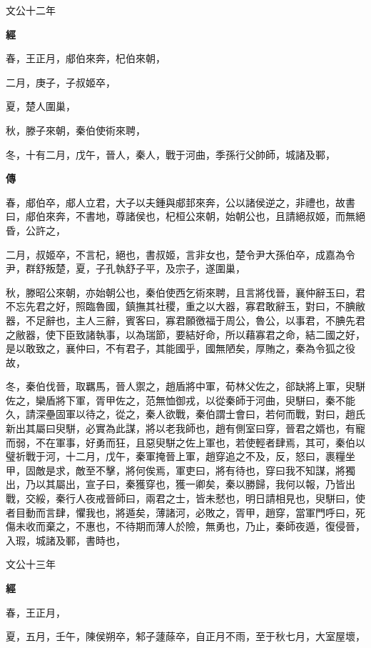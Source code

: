 \documentclass{ctexart}
\begin{document}
文公十二年


\textbf{經}



春，王正月，郕伯來奔，杞伯來朝，

二月，庚子，子叔姬卒，

夏，楚人圍巢，

秋，滕子來朝，秦伯使術來聘，

冬，十有二月，戊午，晉人，秦人，戰于河曲，季孫行父帥師，城諸及鄆，

\textbf{傳}



春，郕伯卒，郕人立君，大子以夫鍾與郕邽來奔，公以諸侯逆之，非禮也，故書曰，郕伯來奔，不書地，尊諸侯也，杞桓公來朝，始朝公也，且請絕叔姬，而無絕昏，公許之，

二月，叔姬卒，不言杞，絕也，書叔姬，言非女也，楚令尹大孫伯卒，成嘉為令尹，群舒叛楚，夏，子孔執舒子平，及宗子，遂圍巢，

秋，滕昭公來朝，亦始朝公也，秦伯使西乞術來聘，且言將伐晉，襄仲辭玉曰，君不忘先君之好，照臨魯國，鎮撫其社稷，重之以大器，寡君敢辭玉，對曰，不腆敝器，不足辭也，主人三辭，賓客曰，寡君願徼福于周公，魯公，以事君，不腆先君之敝器，使下臣致諸執事，以為瑞節，要結好命，所以藉寡君之命，結二國之好，是以敢致之，襄仲曰，不有君子，其能國乎，國無陋矣，厚賄之，秦為令狐之役故，

冬，秦伯伐晉，取羈馬，晉人禦之，趙盾將中軍，荀林父佐之，郤缺將上軍，臾駢佐之，欒盾將下軍，胥甲佐之，范無恤御戎，以從秦師于河曲，臾駢曰，秦不能久，請深壘固軍以待之，從之，秦人欲戰，秦伯謂士會曰，若何而戰，對曰，趙氏新出其屬曰臾駢，必實為此謀，將以老我師也，趙有側室曰穿，晉君之婿也，有寵而弱，不在軍事，好勇而狂，且惡臾駢之佐上軍也，若使輕者肆焉，其可，秦伯以璧祈戰于河，十二月，戊午，秦軍掩晉上軍，趙穿追之不及，反，怒曰，裹糧坐甲，固敵是求，敵至不擊，將何俟焉，軍吏曰，將有待也，穿曰我不知謀，將獨出，乃以其屬出，宣子曰，秦獲穿也，獲一卿矣，秦以勝歸，我何以報，乃皆出戰，交綏，秦行人夜戒晉師曰，兩君之士，皆未憖也，明日請相見也，臾駢曰，使者目動而言肆，懼我也，將遁矣，薄諸河，必敗之，胥甲，趙穿，當軍門呼曰，死傷未收而棄之，不惠也，不待期而薄人於險，無勇也，乃止，秦師夜遁，復侵晉，入瑕，城諸及鄆，書時也，





文公十三年


\textbf{經}



春，王正月，

夏，五月，壬午，陳侯朔卒，邾子蘧蒢卒，自正月不雨，至于秋七月，大室屋壞，
\end{document}
